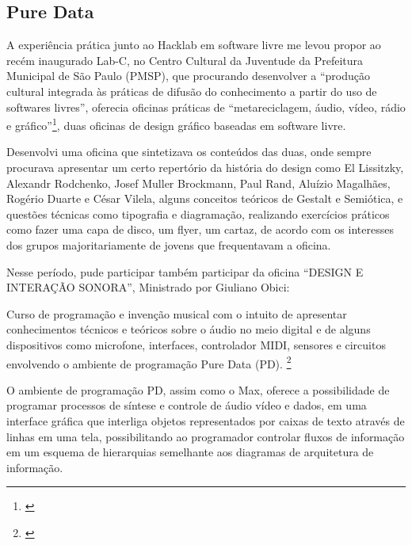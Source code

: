 \subsection{Pure Data}

A experiência prática junto ao Hacklab em software livre me levou propor ao recém inaugurado Lab-C, no Centro Cultural da Juventude da Prefeitura Municipal de São Paulo (PMSP), que procurando desenvolver a ``produção cultural integrada às práticas de difusão do conhecimento a partir do uso de softwares livres'', oferecia oficinas práticas de ``metareciclagem, áudio, vídeo, rádio e gráfico''\footnote{\cite{PMSP2008}}, duas oficinas de design gráfico baseadas em software livre.  

Desenvolvi uma oficina que sintetizava os conteúdos das duas, onde sempre procurava apresentar um certo repertório da história do design como El Lissitzky, Alexandr Rodchenko, Josef Muller Brockmann, Paul Rand, Aluízio Magalhães, Rogério Duarte e César Vilela, alguns conceitos teóricos de Gestalt e Semiótica, e questões técnicas como tipografia e diagramação, realizando exercícios práticos como fazer uma capa de disco, um flyer, um cartaz, de acordo com os interesses dos grupos majoritariamente de jovens que frequentavam a oficina. 

Nesse período, pude participar também participar da oficina ``DESIGN E INTERAÇÃO SONORA'', Ministrado por Giuliano Obici:
\begin{citacao}
Curso de programação e invenção musical com o intuito de apresentar conhecimentos técnicos e teóricos sobre o áudio no meio digital e de alguns dispositivos como microfone, interfaces, controlador MIDI, sensores e circuitos envolvendo o ambiente de programação Pure Data (PD). \footnote{\cite{PMSP2008}}
\end{citacao}

O ambiente de programação PD, assim como o Max, oferece a possibilidade de programar processos de síntese e controle de áudio vídeo e dados, em uma interface gráfica que interliga objetos representados por caixas de texto através de linhas em uma tela, possibilitando ao programador controlar fluxos de informação em um esquema de hierarquias semelhante aos diagramas de arquitetura de informação. 

